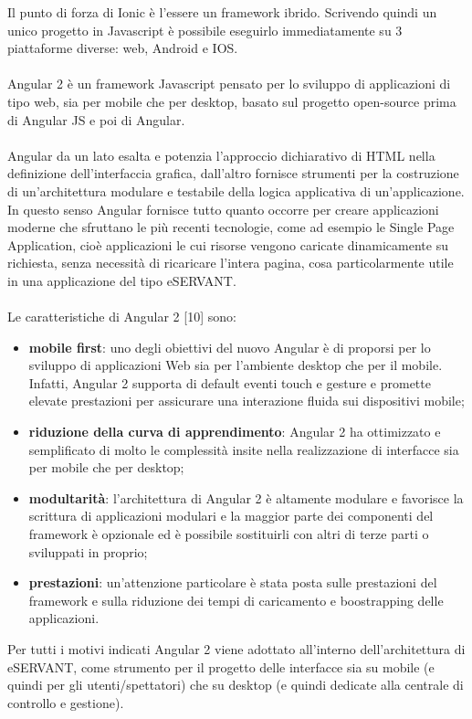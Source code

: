 Il punto di forza di Ionic è l’essere un framework ibrido. Scrivendo quindi un unico progetto in Javascript è possibile eseguirlo immediatamente su 3 piattaforme diverse: web, Android e IOS.
\paragraph{}

Angular 2 è un framework Javascript pensato per lo sviluppo di applicazioni di tipo web, sia per mobile che per desktop, basato sul progetto open-source prima di Angular JS e poi di Angular.
\paragraph{}

Angular da un lato esalta e potenzia l’approccio dichiarativo di HTML nella definizione
dell’interfaccia grafica, dall’altro fornisce strumenti per la costruzione di un’architettura modulare e testabile della logica applicativa di un’applicazione.
In questo senso Angular fornisce tutto quanto occorre per creare applicazioni moderne che
sfruttano le più recenti tecnologie, come ad esempio le Single Page Application, cioè
applicazioni le cui risorse vengono caricate dinamicamente su richiesta, senza necessità di
ricaricare l’intera pagina, cosa particolarmente utile in una applicazione del tipo eSERVANT.
\paragraph{}

Le caratteristiche di Angular 2 [10] sono:

\begin{itemize}
    \item  \textbf{mobile first}: uno degli obiettivi del nuovo Angular è di proporsi per lo
    sviluppo di applicazioni Web sia per l’ambiente desktop che per il mobile.
    Infatti, Angular 2 supporta di default eventi touch e gesture e promette
    elevate prestazioni per assicurare una interazione fluida sui dispositivi
    mobile;
    \item \textbf{riduzione della curva di apprendimento}: Angular 2 ha ottimizzato e
    semplificato di molto le complessità insite nella realizzazione di interfacce
    sia per mobile che per desktop;
    \item \textbf{modultarità}: l’architettura di Angular 2 è altamente modulare e favorisce la
    scrittura di applicazioni modulari e la maggior parte dei componenti del
    framework è opzionale ed è possibile sostituirli con altri di terze parti o
    sviluppati in proprio;
    \item \textbf{prestazioni}: un’attenzione particolare è stata posta sulle prestazioni del
    framework e sulla riduzione dei tempi di caricamento e boostrapping delle
    applicazioni.
\end{itemize}

Per tutti i motivi indicati Angular 2 viene adottato all’interno dell’architettura di
eSERVANT, come strumento per il progetto delle interfacce sia su mobile (e quindi per
gli utenti/spettatori) che su desktop (e quindi dedicate alla centrale di controllo e
gestione).
